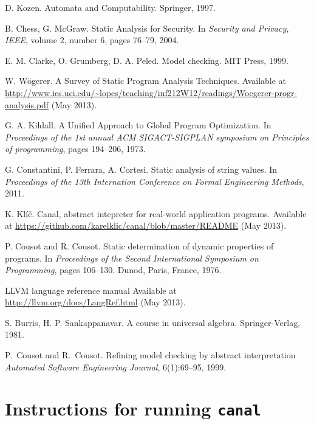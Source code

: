 \documentclass[12pt,final,oneside]{fithesis2}
\theoremstyle{definition}
\begin{document}
\begin{thebibliography}{99}
D{.} Kozen.
\newblock Automata and Computability.
\newblock Springer, 1997.

B{.} Chess, G{.} McGraw.
\newblock Static Analysis for Security.
\newblock In \emph{Security and Privacy, IEEE}, volume 2, number 6,
  pages 76--79, 2004.

E{.} M{.} Clarke, O{.} Grumberg, D{.} A{.} Peled.
\newblock Model checking.
\newblock MIT Press, 1999.

W{.} W\"{o}gerer.
\newblock A Survey of Static Program Analysis Techniques.
\newblock Available at \url{http://www.ics.uci.edu/~lopes/teaching/inf212W12/readings/Woegerer-progr-analysis.pdf}
  (May 2013).

G{.} A{.} Kildall.
\newblock A Unified Approach to Global Program Optimization.
\newblock In \emph{Proceedings of the 1st annual ACM SIGACT-SIGPLAN
  symposium on Principles of programming}, pages 194--206, 1973.

G{.} Constantini, P{.} Ferrara, A{.} Cortesi.
\newblock Static analysis of string values.
\newblock In \emph{Proceedings of the 13th Internation Conference on Formal
  Engineering Methods}, 2011.

K{.} Klíč.
\newblock Canal, abstract intepreter for real-world application programs.
\newblock Available at \url{https://github.com/karelklic/canal/blob/master/README}
  (May 2013).

P{.} Cousot and R{.} Cousot.
\newblock Static determination of dynamic properties of programs.
\newblock In {\em Proceedings of the Second International Symposium on
  Programming}, pages 106--130. Dunod, Paris, France, 1976.

\newblock LLVM language reference manual
\newblock Available at \url{http://llvm.org/docs/LangRef.html} (May 2013).

S{.} Burris, H{.} P{.} Sankappanavar.
\newblock A course in universal algebra.
\newblock Springer-Verlag, 1981.

P.~Cousot and R.~Cousot.
\newblock Refining model checking by abstract interpretation
\newblock \emph{Automated Software Engineering Journal}, 6(1):69--95, 1999.

\end{thebibliography}


\appendix

\chapter{Instructions for running \texttt{canal}}
\label{chap:instructions}

\end{document}
